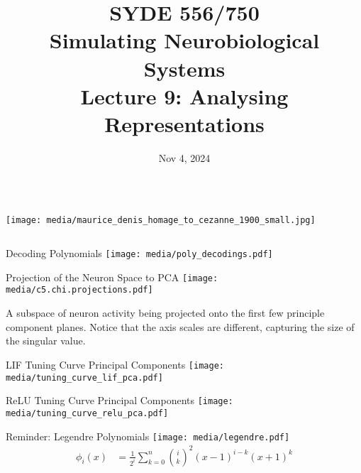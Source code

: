 \documentclass[handout,aspectratio=169]{beamer}
\date{Nov 4, 2024}
\title{SYDE 556/750 \\ Simulating Neurobiological Systems \\ Lecture 9: Analysing Representations}
\begin{document}
	
	\begin{frame}{}
		\vspace{0.5cm}
		\begin{columns}[c]
			\MakeTitle
			\texttt{[image: media/maurice\_denis\_homage\_to\_cezanne\_1900\_small.jpg]}
		\end{columns}
	\end{frame}

	\begin{frame}{Decoding Polynomials}
		\centering
		\texttt{[image: media/poly\_decodings.pdf]} 
	\end{frame}

  \begin{frame}{Projection of the Neuron Space to PCA}
    \centering
    \texttt{[image: media/c5.chi.projections.pdf]}
    
    A subspace of neuron activity being projected onto the first few principle component planes. Notice that the axis scales are different, capturing the size of the singular value.
  \end{frame}

	\begin{frame}{LIF Tuning Curve Principal Components}
		\centering
		\texttt{[image: media/tuning\_curve\_lif\_pca.pdf]}
		\begin{overlayarea}{\textwidth}{0.5cm}
			\centering
		\end{overlayarea}
	\end{frame}

	\begin{frame}{ReLU Tuning Curve Principal Components}
		\centering
		\texttt{[image: media/tuning\_curve\_relu\_pca.pdf]}
		\begin{overlayarea}{\textwidth}{0.5cm}
			\centering
			\only<2->{\hl{$\approx$ Legendre Basis}}
		\end{overlayarea}
	\end{frame}

	\begin{frame}{Reminder: Legendre Polynomials}
		\centering
		\texttt{[image: media/legendre.pdf]}
		\begin{align*}
			\phi_i(x)&= \frac{1}{2^i} \sum_{k=0}^n \binom{i}{k}^2 (x-1)^{i-k}(x+1)^k
		\end{align*}
		\begin{overlayarea}{\textwidth}{0.5cm}
			\centering
		\end{overlayarea}
	\end{frame}
\end{document}
